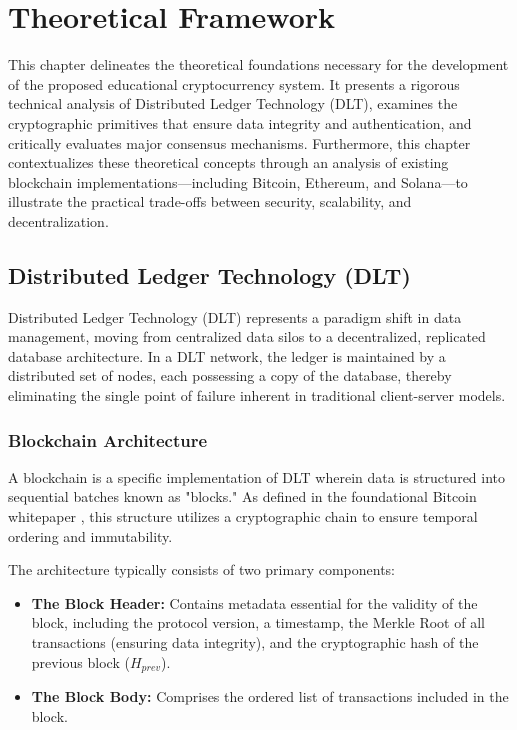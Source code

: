 \chapter{Theoretical Framework} \label{ch2_theoretical_framework}

This chapter delineates the theoretical foundations necessary for the development of the proposed educational cryptocurrency system. It presents a rigorous technical analysis of Distributed Ledger Technology (DLT), examines the cryptographic primitives that ensure data integrity and authentication, and critically evaluates major consensus mechanisms. Furthermore, this chapter contextualizes these theoretical concepts through an analysis of existing blockchain implementations—including Bitcoin, Ethereum, and Solana—to illustrate the practical trade-offs between security, scalability, and decentralization.

\section{Distributed Ledger Technology (DLT)} \label{ch2_dlt}

Distributed Ledger Technology (DLT) represents a paradigm shift in data management, moving from centralized data silos to a decentralized, replicated database architecture. In a DLT network, the ledger is maintained by a distributed set of nodes, each possessing a copy of the database, thereby eliminating the single point of failure inherent in traditional client-server models.

\subsection{Blockchain Architecture}
A blockchain is a specific implementation of DLT wherein data is structured into sequential batches known as "blocks." As defined in the foundational Bitcoin whitepaper \cite{nakamoto2008bitcoin}, this structure utilizes a cryptographic chain to ensure temporal ordering and immutability.

The architecture typically consists of two primary components:
\begin{itemize}
    \item \textbf{The Block Header:} Contains metadata essential for the validity of the block, including the protocol version, a timestamp, the Merkle Root of all transactions (ensuring data integrity), and the cryptographic hash of the previous block ($H_{prev}$).
    \item \textbf{The Block Body:} Comprises the ordered list of transactions included in the block.
\end{itemize}

